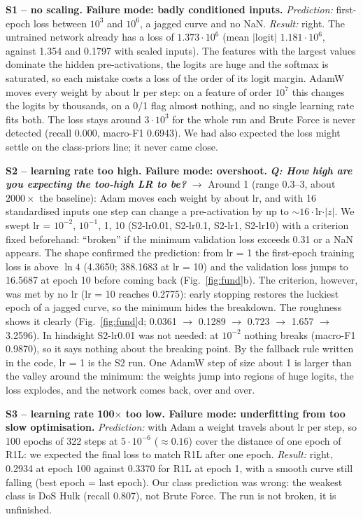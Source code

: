 \documentclass[9pt]{extarticle}
\newcommand{\Q}[1]{\textbf{\emph{Q: #1}}}
\newcommand{\run}[1]{\textsf{#1}}
\begin{document}
\textbf{\run{S1} -- no scaling. Failure mode: badly conditioned inputs.} \emph{Prediction:} first-epoch loss between $10^3$ and $10^6$, a jagged curve and no NaN. \emph{Result:} right. The untrained network already has a loss of $1.373\cdot10^6$ (mean $|$logit$|$ $1.181\cdot10^6$, against 1.354 and 0.1797 with scaled inputs). The features with the largest values dominate the hidden pre-activations, the logits are huge and the softmax is saturated, so each mistake costs a loss of the order of its logit margin. AdamW moves every weight by about lr per step: on a feature of order $10^7$ this changes the logits by thousands, on a 0/1 flag almost nothing, and no single learning rate fits both. The loss stays around $3\cdot10^3$ for the whole run and Brute Force is never detected (recall 0.000, macro-F1 0.6943). We had also expected the loss might settle on the class-priors line; it never came close.

\textbf{\run{S2} -- learning rate too high. Failure mode: overshoot.} \Q{How high are you expecting the too-high LR to be?} $\rightarrow$ Around 1 (range 0.3--3, about $2000\times$ the baseline): Adam moves each weight by about lr, and with 16 standardised inputs one step can change a pre-activation by up to $\sim16\cdot$lr$\cdot|z|$. We swept lr = $10^{-2}$, $10^{-1}$, 1, 10 (\run{S2-lr0.01}, \run{S2-lr0.1}, \run{S2-lr1}, \run{S2-lr10}) with a criterion fixed beforehand: ``broken'' if the minimum validation loss exceeds 0.31 or a NaN appears. The shape confirmed the prediction: from lr = 1 the first-epoch training loss is above $\ln 4$ (4.3650; 388.1683 at lr = 10) and the validation loss jumps to 16.5687 at epoch 10 before coming back (Fig.~\ref{fig:fund}b). The criterion, however, was met by no lr (lr = 10 reaches 0.2775): early stopping restores the luckiest epoch of a jagged curve, so the minimum hides the breakdown. The roughness shows it clearly (Fig.~\ref{fig:fund}d; 0.0361 $\rightarrow$ 0.1289 $\rightarrow$ 0.723 $\rightarrow$ 1.657 $\rightarrow$ 3.2596). In hindsight \run{S2-lr0.01} was not needed: at $10^{-2}$ nothing breaks (macro-F1 0.9870), so it says nothing about the breaking point. By the fallback rule written in the code, lr = 1 is the \run{S2} run. One AdamW step of size about 1 is larger than the valley around the minimum: the weights jump into regions of huge logits, the loss explodes, and the network comes back, over and over.

\textbf{\run{S3} -- learning rate 100$\times$ too low. Failure mode: underfitting from too slow optimisation.} \emph{Prediction:} with Adam a weight travels about lr per step, so 100 epochs of 322 steps at $5\cdot10^{-6}$ ($\approx 0.16$) cover the distance of one epoch of \run{R1L}: we expected the final loss to match \run{R1L} after one epoch. \emph{Result:} right, 0.2934 at epoch 100 against 0.3370 for \run{R1L} at epoch 1, with a smooth curve still falling (best epoch = last epoch). Our class prediction was wrong: the weakest class is DoS Hulk (recall 0.807), not Brute Force. The run is not broken, it is unfinished.
\end{document}
